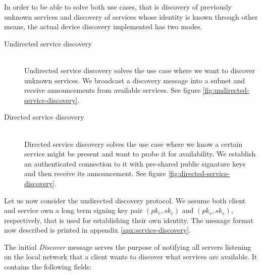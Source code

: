 In order to be able to solve both use cases, that is discovery of previously unknown services and discovery of services whose identity is known through other means, the actual device discovery implemented has two modes.
\begin{description}
    \item[Undirected service discovery]\hfill\\
        Undirected service discovery solves the use case where we want to discover unknown services.
        We broadcast a discovery  message into a subnet and receive announcements from available services.
        See figure \ref{fig:undirected-service-discovery}.
    \item[Directed service discovery]\hfill\\
        Directed service discovery solves the use case where we know a certain service might be present and want to probe it for availability.
        We establish an authenticated connection to it with pre-shared public signature keys and then receive its announcement.
        See figure \ref{fig:directed-service-discovery}.
\end{description}

Let us now consider the undirected discovery protocol.
We assume both client and service own a long term signing key pair $(pk_c, sk_c)$ and $(pk_s, sk_s)$, respectively, that is used for establishing their own identity.
The message format now described is printed in appendix \ref{apx:service-discovery}.

The initial \emph{Discover} message serves the purpose of notifying all servers listening on the local network that a client wants to discover what services are available.
It contains the following fields:

